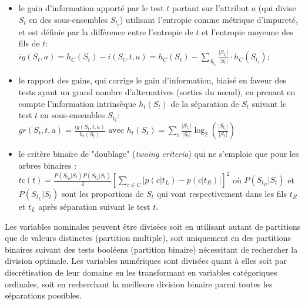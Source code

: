 \begin{itemize}
	\item le gain d'information apporté par le test $t$ portant sur l'attribut $a$ (qui divise $S_t$ en des sous-ensembles $S_{t_i}$) utilisant l'entropie comme métrique d'impureté, et est définie par la différence entre l'entropie de $t$ et l'entropie moyenne des fils de $t$: \\ $ig(S_t, a) = h_C(S_t) - i(S_t, t, a) =  h_C(S_t) - \sum\limits_{S_{t_i}} \frac{\vert S_{t_i} \vert}{\vert S_{t} \vert} \cdot h_C(S_{t_i});$
	\item le rapport des gains, qui corrige le gain d'information, biaisé en faveur des tests ayant un grand nombre d'alternatives (sorties du nœud), en prenant en compte l'information intrinsèque $h_t(S_t)$ de la séparation de $S_t$ suivant le test $t$ en sous-ensembles $S_{t_i}$: \\$gr(S_t, t, a) = \frac{ig(S_t, t, a)}{h_t(S_t)} \text{ avec } h_t(S_t) = \sum\limits_i \frac{\vert S_{t_i}\vert}{\vert S_t \vert} \log_2 \left(\frac{\vert S_{t_i}\vert}{\vert S_t \vert}\right)$
	\item le critère binaire de "doublage" (\textit{twoing criteria}) qui ne s'emploie que pour les arbres binaires : \\ $tc(t) = \frac{P(S_{t_R} \vert S_t)P(S_{t_L} \vert S_t)}{4} \left[\sum\limits_{c \in C} \vert p(c \vert t_L) - p(c \vert t_R)\vert\right]^2$ où  $P(S_{t_R} \vert S_t)$ et $P(S_{t_L} \vert S_t)$ sont les proportions de $S_t$ qui vont respectivement dans les fils $t_R$ et $t_L$ après séparation suivant le test $t$.
\end{itemize}

Les variables nominales peuvent être divisées soit en utilisant autant de partitions que de valeurs distinctes (partition multiple), soit uniquement en des partitions binaires suivant des tests booléens (partition binaire) nécessitant de rechercher la division optimale. Les variables numériques sont divisées quant à elles soit par discrétisation de leur domaine en les transformant en variables catégoriques ordinales, soit en recherchant la meilleure division binaire parmi  toutes les séparations possibles. 

